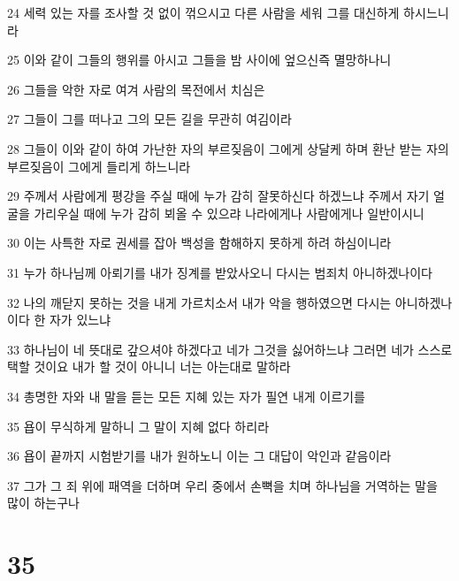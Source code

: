 \par 24 세력 있는 자를 조사할 것 없이 꺾으시고 다른 사람을 세워 그를 대신하게 하시느니라
\par 25 이와 같이 그들의 행위를 아시고 그들을 밤 사이에 엎으신즉 멸망하나니
\par 26 그들을 악한 자로 여겨 사람의 목전에서 치심은
\par 27 그들이 그를 떠나고 그의 모든 길을 무관히 여김이라
\par 28 그들이 이와 같이 하여 가난한 자의 부르짖음이 그에게 상달케 하며 환난 받는 자의 부르짖음이 그에게 들리게 하느니라
\par 29 주께서 사람에게 평강을 주실 때에 누가 감히 잘못하신다 하겠느냐 주께서 자기 얼굴을 가리우실 때에 누가 감히 뵈올 수 있으랴 나라에게나 사람에게나 일반이시니
\par 30 이는 사특한 자로 권세를 잡아 백성을 함해하지 못하게 하려 하심이니라
\par 31 누가 하나님께 아뢰기를 내가 징계를 받았사오니 다시는 범죄치 아니하겠나이다
\par 32 나의 깨닫지 못하는 것을 내게 가르치소서 내가 악을 행하였으면 다시는 아니하겠나이다 한 자가 있느냐
\par 33 하나님이 네 뜻대로 갚으셔야 하겠다고 네가 그것을 싫어하느냐 그러면 네가 스스로 택할 것이요 내가 할 것이 아니니 너는 아는대로 말하라
\par 34 총명한 자와 내 말을 듣는 모든 지혜 있는 자가 필연 내게 이르기를
\par 35 욥이 무식하게 말하니 그 말이 지혜 없다 하리라
\par 36 욥이 끝까지 시험받기를 내가 원하노니 이는 그 대답이 악인과 같음이라
\par 37 그가 그 죄 위에 패역을 더하며 우리 중에서 손뼉을 치며 하나님을 거역하는 말을 많이 하는구나

\chapter{35}


